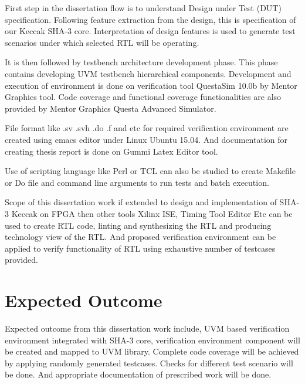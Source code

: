 First step in the dissertation flow is to understand Design under Test (DUT) specification. Following feature extraction from the design, this is specification of our Keccak SHA-3 core. Interpretation of design features is used to generate test scenarios under which selected RTL will be operating. \par

It is then followed by testbench architecture development phase. This phase contains developing UVM testbench hierarchical components. Development and execution of environment is done on verification tool QuestaSim 10.0b by Mentor Graphics tool. Code coverage and functional coverage functionalities are also provided by Mentor Graphics Questa Advanced Simulator. \par

File format like .sv .svh .do .f and etc for required verification environment are created using emacs editor under Linux Ubuntu 15.04. And documentation for creating thesis report is done on Gummi Latex Editor tool.\par

Use of scripting language like Perl or TCL can also be studied to create Makefile or Do file and command line arguments to run tests and batch execution. \par

Scope of this dissertation work if extended to design and implementation of SHA-3 Keccak on FPGA then other tools Xilinx ISE, Timing Tool Editor Etc can be used to create RTL code, linting and synthesizing the RTL and producing technology view of the RTL. And proposed verification environment can be applied to verify functionality of RTL using exhaustive number of testcases provided.

\section{Expected Outcome}

Expected outcome from this dissertation work include, UVM based verification environment integrated with SHA-3 core, verification environment component will be created and mapped to UVM library. Complete code coverage will be achieved by applying randomly generated testcases. Checks for different test scenario will be done. And appropriate documentation of prescribed work will be done.